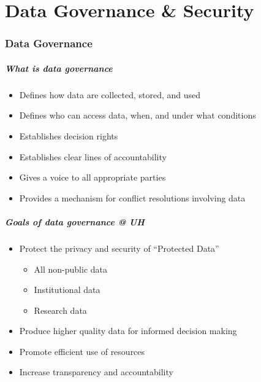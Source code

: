 \part{Data Governance \& Security}
\begin{frame}
			 \partpage
\end{frame}

\section[Data Governance]{Data Governance}

\begin{frame}
  \frametitle{What is data governance}
  \begin{itemize}
  \item Defines how data are collected, stored, and used
  \item Defines who can access data, when, and under what conditions
  \item Establishes decision rights
  \item Establishes clear lines of accountability
  \item Gives a voice to all appropriate parties
  \item Provides a mechanism for conflict resolutions involving data
  \end{itemize}
\end{frame}


\begin{frame}
  \frametitle{Goals of data governance @ UH}  
  \begin{itemize}
  \item Protect the privacy and security of ``Protected Data''
    \begin{itemize}
    \item All non-public data
    \item Institutional data
    \item Research data
    \end{itemize}
  \item Produce higher quality data for informed decision making
  \item Promote efficient use of resources
  \item Increase transparency and accountability
  \end{itemize}
\end{frame}


